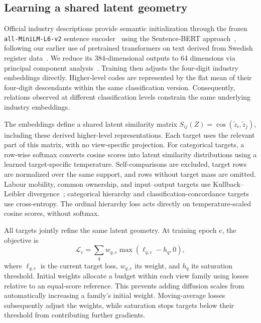 \documentclass[9pt,twocolumn,twoside]{pnas-new}
\begin{document}
\subsection{Learning a shared latent geometry}
\label{subsec:learning-opportunity-space}

Official industry descriptions provide semantic initialization through the frozen \texttt{all-MiniLM-L6-v2} sentence encoder~\cite{wangMiniLMDeepSelfAttention2020} using the Sentence-BERT approach~\cite{reimersSentenceBERTSentenceEmbeddings2019}, following our earlier use of pretrained transformers on text derived from Swedish register data~\cite{Stark2026TextLifeTrajectories}. We reduce its 384-dimensional outputs to 64 dimensions via principal component analysis~\cite{jolliffePrincipalComponentAnalysis2025}. Training then adjusts the four-digit industry embeddings directly. Higher-level codes are represented by the flat mean of their four-digit descendants within the same classification version. Consequently, relations observed at different classification levels constrain the same underlying industry embeddings.

The embeddings define a shared latent similarity matrix $S_{ij}(Z)=\cos(\widetilde z_i,\widetilde z_j)$, including these derived higher-level representations. Each target uses the relevant part of this matrix, with no view-specific projection. For categorical targets, a row-wise softmax converts cosine scores into latent similarity distributions using a learned target-specific temperature. Self-comparisons are excluded, target rows are normalized over the same support, and rows without target mass are omitted. Labour mobility, common ownership, and input--output targets use Kullback--Leibler divergence~\cite{kullbackInformationSufficiency1951}; categorical hierarchy and classification-concordance targets use cross-entropy. The ordinal hierarchy loss acts directly on temperature-scaled cosine scores, without softmax.

All targets jointly refine the same latent geometry. At training epoch $e$, the objective is
\begin{equation}
\mathcal{L}_e=\sum_q w_{q,e}\max\!\left(\ell_{q,e}-h_q,0\right),
\label{eq:joint-loss}
\end{equation}
where $\ell_{q,e}$ is the current target loss, $w_{q,e}$ its weight, and $h_q$ its saturation threshold. Initial weights allocate a budget within each view family using losses relative to an equal-score reference. This prevents adding diffusion scales from automatically increasing a family's initial weight. Moving-average losses subsequently adjust the weights, while saturation stops targets below their threshold from contributing further gradients.
\end{document}
